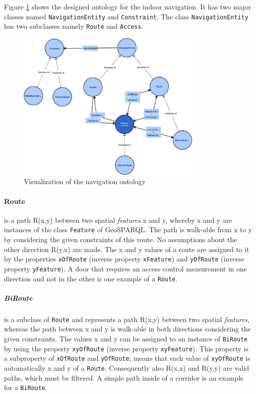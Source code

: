 \documentclass[draft,final]{vutinfth} %
\begin{document}
Figure \ref{fig:solution-ontology-prototype:navigation} shows the designed ontology for the indoor navigation. It has two major classes named \texttt{NavigationEntity} and \texttt{Constraint}. The class \texttt{NavigationEntity} has two subclasses namely \texttt{Route} and \texttt{Access}.

\begin{figure}[h]
    \centering
    \includegraphics[width=0.8\textwidth]{graphics/solution/ontology/tuViennaNavigationOntology.png}
    \caption{Visualization of the navigation ontology}
    \label{fig:solution-ontology-prototype:navigation}
\end{figure}

\paragraph{Route} is a path R(x,y) between two spatial \textit{features} x and y, whereby x and y are instances of the class \texttt{Feature} of GeoSPARQL. The path is walk-able from x to y by considering the given constraints of this route. No assumptions about the other direction R(y,x) are made. The x and y values of a route are assigned to it by the properties \texttt{xOfRoute} (inverse property \texttt{xFeature}) and \texttt{yOfRoute} (inverse property \texttt{yFeature}). A door that requires an access control measurement in one direction and not in the other is one example of a \texttt{Route}.

\subparagraph{BiRoute} is a subclass of \texttt{Route} and represents a path R(x,y) between two spatial \textit{features}, whereas the path between x and y is walk-able in both directions considering the given constraints. The values x and y can be assigned to an instance of \texttt{BiRoute} by using the property \texttt{xyOfRoute} (inverse property \texttt{xyFeature}). This property is a subproperty of \texttt{xOfRoute} and \texttt{yOfRoute}; means that each value of \texttt{xyOfRoute} is automatically x and y of a \texttt{Route}. Consequently also R(x,x) and R(y,y) are valid paths, which must be filtered. A simple path inside of a corridor is an example for a \texttt{BiRoute}.
\end{document}
